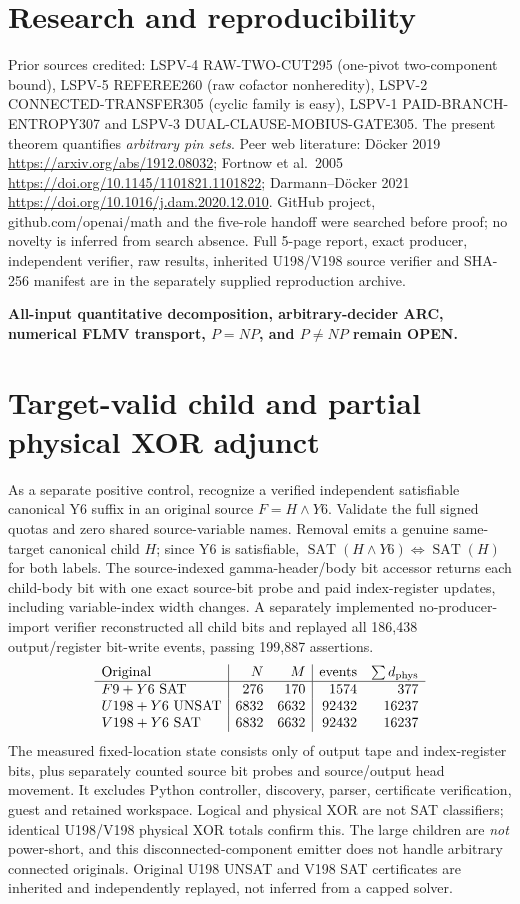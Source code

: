 \documentclass[11pt]{article}
\begin{document}
\section{Research and reproducibility}
Prior sources credited: LSPV-4 RAW-TWO-CUT295 (one-pivot two-component bound), LSPV-5 REFEREE260 (raw cofactor nonheredity), LSPV-2 CONNECTED-TRANSFER305 (cyclic family is easy), LSPV-1 PAID-BRANCH-ENTROPY307 and LSPV-3 DUAL-CLAUSE-MOBIUS-GATE305. The present theorem quantifies \emph{arbitrary pin sets}. Peer web literature: D\"ocker 2019 \url{https://arxiv.org/abs/1912.08032}; Fortnow et al.\ 2005 \url{https://doi.org/10.1145/1101821.1101822}; Darmann--D\"ocker 2021 \url{https://doi.org/10.1016/j.dam.2020.12.010}. GitHub project, github.com/openai/math and the five-role handoff were searched before proof; no novelty is inferred from search absence. Full 5-page report, exact producer, independent verifier, raw results, inherited U198/V198 source verifier and SHA-256 manifest are in the separately supplied reproduction archive.
\par\noindent\textbf{All-input quantitative decomposition, arbitrary-decider ARC, numerical FLMV transport, $P=NP$, and $P\ne NP$ remain OPEN.}
\section{Target-valid child and partial physical XOR adjunct}
As a separate positive control, recognize a verified independent satisfiable canonical Y6 suffix in an original source $F=H\land Y6$. Validate the full signed quotas and zero shared source-variable names. Removal emits a genuine same-target canonical child $H$; since Y6 is satisfiable,
$\operatorname{SAT}(H\land Y6)\iff\operatorname{SAT}(H)$ for both labels.
The source-indexed gamma-header/body bit accessor returns each child-body bit with one exact source-bit probe and paid index-register updates, including variable-index width changes.
A separately implemented no-producer-import verifier reconstructed all child bits and replayed all 186,438 output/register bit-write events, passing 199,887 assertions.
\[
\begin{array}{l|rr|rr}
\text{Original}&N&M&\text{events}&\sum d_{\rm phys}\\\hline
F9+Y6\ \mathrm{SAT}&276&170&1574&377\\
U198+Y6\ \mathrm{UNSAT}&6832&6632&92432&16237\\
V198+Y6\ \mathrm{SAT}&6832&6632&92432&16237
\end{array}
\]
The measured fixed-location state consists only of output tape and index-register bits, plus separately counted source bit probes and source/output head movement. It excludes Python controller, discovery, parser, certificate verification, guest and retained workspace. Logical and physical XOR are not SAT classifiers; identical U198/V198 physical XOR totals confirm this. The large children are \emph{not} power-short, and this disconnected-component emitter does not handle arbitrary connected originals. Original U198 UNSAT and V198 SAT certificates are inherited and independently replayed, not inferred from a capped solver.
\end{document}
